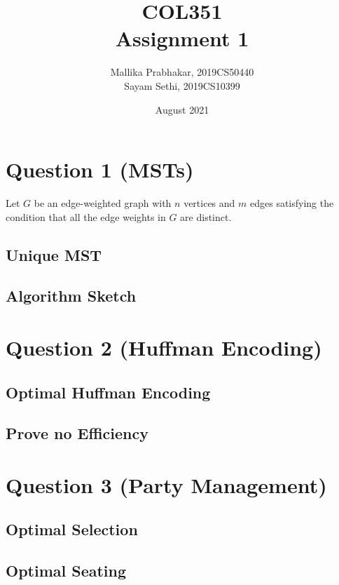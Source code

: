 \documentclass[12pt]{article}
\title{COL351 \\ Assignment 1}
\author{Mallika Prabhakar, 2019CS50440 \\ Sayam Sethi, 2019CS10399}
\date{August 2021}
\begin{document}

\maketitle
\tableofcontents
{}


\section{Question 1 (MSTs)}

Let $G$ be an edge-weighted graph with $n$ vertices and $m$ edges satisfying the condition that all the edge weights in $G$ are distinct.

\subsection{Unique MST}


\subsection{Algorithm Sketch}



\section{Question 2 (Huffman Encoding)}

\subsection{Optimal Huffman Encoding}


\subsection{Prove no Efficiency}



\section{Question 3 (Party Management)}

\subsection{Optimal Selection}


\subsection{Optimal Seating}

\end{document}
